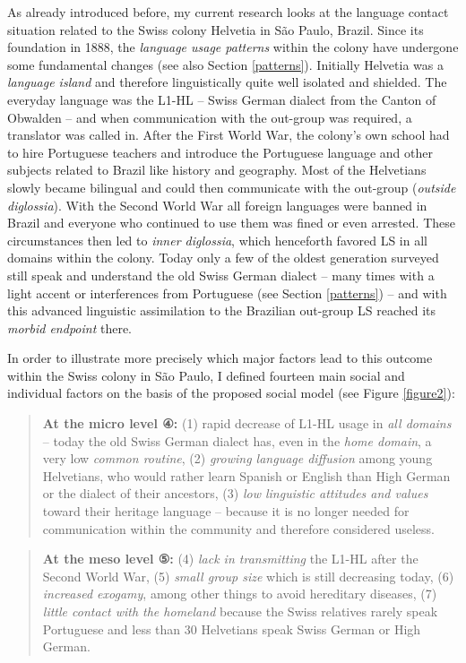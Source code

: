 \documentclass[output=paper,
modfonts
]{langscibook}
\begin{document}
As already introduced before, my current research \parencite{Karnopp} looks at the language contact situation related to the Swiss colony Helvetia in São Paulo, Brazil. Since its foundation in 1888, the \emph{language usage patterns} within the colony have undergone some fundamental changes (see also Section \ref{patterns}). Initially Helvetia was a \emph{language island} and therefore linguistically quite well isolated and shielded. The everyday language was the L1-HL -- Swiss German dialect from the Canton of Obwalden -- and when communication with the out-group was required, a translator was called in. After the First World War, the colony's own school had to hire Portuguese teachers and introduce the Portuguese language and other subjects related to Brazil like history and geography. Most of the Helvetians slowly became bilingual and could then communicate with the out-group (\emph{outside diglossia}). With the Second World War all foreign languages were banned in Brazil and everyone who continued to use them was fined or even arrested. These circumstances then led to \emph{inner diglossia}, which henceforth favored LS in all domains within the colony. Today only a few of the oldest generation surveyed still speak and understand the old Swiss German dialect -- many times with a light accent or interferences from Portuguese (see Section \ref{patterns}) -- and with this advanced linguistic assimilation to the Brazilian out-group LS reached its \emph{morbid endpoint} there.

In order to illustrate more precisely which major factors lead to this outcome within the Swiss colony in São Paulo, I defined fourteen main social and individual factors on the basis of the proposed social model (see Figure \ref{figure2}):
\begin{quote}
\textbf{At the micro level ④:} (1) rapid decrease of L1-HL usage in \emph{all domains} -- today the old Swiss German dialect has, even in the \emph{home domain}, a very low \emph{common routine}, (2) \emph{growing language diffusion} among young Helvetians, who would rather learn Spanish or English than High German or the dialect of their ancestors, (3) \emph{low linguistic attitudes and values} toward their heritage language -- because it is no longer needed for communication within the community and therefore considered useless.\end{quote}

\begin{quote}
\textbf{At the meso level ⑤:} (4) \emph{lack in transmitting} the L1-HL after the Second World War, (5) \emph{small group size} which is still decreasing today, (6) \emph{increased exogamy}, among other things to avoid hereditary diseases, (7) \emph{little contact with the homeland} because the Swiss relatives rarely speak Portuguese and less than 30 Helvetians speak Swiss German or High German.\end{quote}
\end{document}
